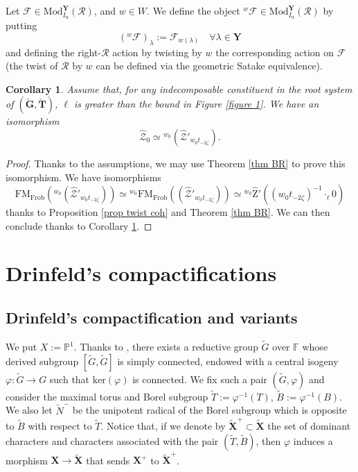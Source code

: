 \documentclass[11pt]{amsart}
\theoremstyle{plain}
\newtheorem{coro}[thm]{Corollary}
\theoremstyle{remark}
\numberwithin{equation}{section}
\begin{document}
Let $\mathcal{F}\in \mathrm{Mod}^\mathbf{Y}_{I_\mathrm{u}}(\mathcal{R})$, and $w\in W$. We define the object $^w\mathcal{F}\in \mathrm{Mod}^\mathbf{Y}_{I_\mathrm{u}}(\mathcal{R})$ by putting 
$$(^w\mathcal{F})_\lambda:=\mathcal{F}_{w(\lambda)}\quad\forall \lambda\in\mathbf{Y}$$
and defining the right-$\mathcal{R}$ action by twisting by $w$ the corresponding action on $\mathcal{F}$ (the twist of $\mathcal{R}$ by $w$ can be defined via the geometric Satake equivalence). 
\begin{coro}\label{coro ind verma}
    Assume that, for any indecomposable constituent in the root system of $(\check{\mathbf{G}},\check{\mathbf{T}})$, $\ell$ is greater than the bound in Figure \ref{figure 1}. We have an isomorphism
   $$\widehat{\mathcal{Z}}_0\simeq {^{w_0}(\widehat{\mathcal{Z}}'_{w_0t_{-2\zeta}})}.$$ 
\end{coro}
\begin{proof}
   Thanks to the assumptions, we may use Theorem \ref{thm BR} to prove this isomorphism. We have isomorphisms
   $$\mathrm{FM}_{\mathrm{Frob}}({^{w_0}(\widehat{\mathcal{Z}}'_{w_0t_{-2\zeta}})})\simeq {^{w_0}\mathrm{FM}_{\mathrm{Frob}}({(\widehat{\mathcal{Z}}'_{w_0t_{-2\zeta}})})}\simeq {^{w_0}\widehat{\mathrm{Z}}'((w_0t_{-2\zeta})^{-1}\cdot_\ell0)}$$
thanks to Proposition \ref{prop twist coh} and Theorem \ref{thm BR}. We can then conclude thanks to Corollary \ref{coro ind verma}.
\end{proof}

	\section{Drinfeld's compactifications}\label{section Drinfeld's compactifications}
	\subsection{Drinfeld's compactification and variants}\label{section Drinfeld's compactification and variants}
	We put $X:=\mathbb{P}^1$. Thanks to \cite[§4.1.1]{ABBGM}, there exists a reductive group $\tilde{G}$ over $\mathbb{F}$ whose derived subgroup $[\tilde{G},\tilde{G}]$ is simply connected, endowed with a central isogeny $\varphi:\tilde{G}\to G$ such that $\mathrm{ker}(\varphi)$ is connected. We fix such a pair $(\tilde{G},\varphi)$ and consider the maximal torus and Borel subgroup $ \tilde{T}:=\varphi^{-1}(T)$, $\tilde{B}:=\varphi^{-1}(B)$. We also let $\tilde{N}^-$ be the unipotent radical of the Borel subgroup which is opposite to $\tilde{B}$ with respect to $\tilde{T}$. Notice that, if we denote by $\widetilde{\mathbf{X}}^+\subset\widetilde{\mathbf{X}}$ the set of dominant characters and characters associated with the pair $(\tilde{T},\tilde{B})$, then $\varphi$ induces a morphism $\mathbf{X}\to \widetilde{\mathbf{X}}$ that sends $\mathbf{X}^+$ to $\widetilde{\mathbf{X}}^+$.
	
\end{document}
